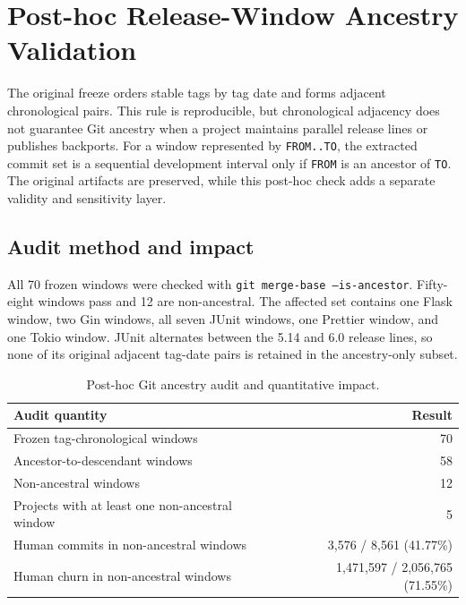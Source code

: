 \section{Post-hoc Release-Window Ancestry Validation}
\label{sec:posthoc_ancestry_validation}

The original freeze orders stable tags by tag date and forms adjacent chronological pairs. This rule is reproducible,
but chronological adjacency does not guarantee Git ancestry when a project maintains parallel release lines or publishes
backports. For a window represented by \texttt{FROM..TO}, the extracted commit set is a sequential development interval
only if \texttt{FROM} is an ancestor of \texttt{TO}. The original artifacts are preserved, while this post-hoc check adds
a separate validity and sensitivity layer.

\subsection{Audit method and impact}
\label{sec:ancestry_audit_method}

All 70 frozen windows were checked with \texttt{git merge-base --is-ancestor}. Fifty-eight windows pass and 12 are
non-ancestral. The affected set contains one Flask window, two Gin windows, all seven JUnit windows, one Prettier window,
and one Tokio window. JUnit alternates between the 5.14 and 6.0 release lines, so none of its original adjacent tag-date
pairs is retained in the ancestry-only subset.

\begin{table}[H]
\centering
\small
\renewcommand{\arraystretch}{1.08}
\begin{tabular}{lr}
\toprule
\textbf{Audit quantity} & \textbf{Result} \\
\midrule
Frozen tag-chronological windows & 70 \\
Ancestor-to-descendant windows & 58 \\
Non-ancestral windows & 12 \\
Projects with at least one non-ancestral window & 5 \\
Human commits in non-ancestral windows & 3,576 / 8,561 (41.77\%) \\
Human churn in non-ancestral windows & 1,471,597 / 2,056,765 (71.55\%) \\
\bottomrule
\end{tabular}
\caption{Post-hoc Git ancestry audit and quantitative impact.}
\label{tab:posthoc_ancestry_impact}
\end{table}


